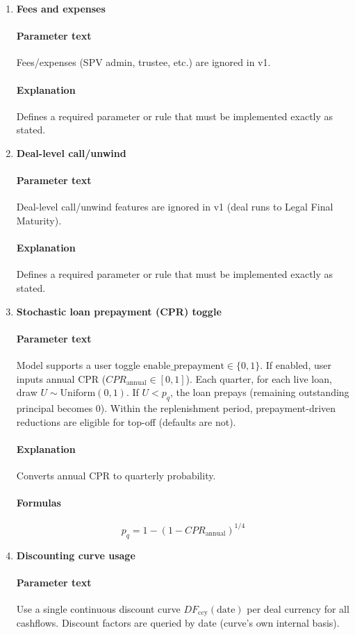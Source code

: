 \documentclass[11pt]{article}
\begin{document}
\begin{enumerate}[label=\arabic*),leftmargin=*,align=left]
\item \textbf{Fees and expenses}
\paragraph{Parameter text} Fees/expenses (SPV admin, trustee, etc.) are ignored in v1.
\paragraph{Explanation} Defines a required parameter or rule that must be implemented exactly as stated.

\item \textbf{Deal-level call/unwind}
\paragraph{Parameter text} Deal-level call/unwind features are ignored in v1 (deal runs to Legal Final Maturity).
\paragraph{Explanation} Defines a required parameter or rule that must be implemented exactly as stated.

\item \textbf{Stochastic loan prepayment (CPR) toggle}
\paragraph{Parameter text} Model supports a user toggle $\text{enable\_prepayment} \in \{0,1\}$. If enabled, user inputs annual CPR ($CPR_{\text{annual}} \in [0,1]$). Each quarter, for each live loan, draw $U \sim \text{Uniform}(0,1)$. If $U < p_q$, the loan prepays (remaining outstanding principal becomes 0). Within the replenishment period, prepayment-driven reductions are eligible for top-off (defaults are not).
\paragraph{Explanation} Converts annual CPR to quarterly probability.
\paragraph{Formulas} 
\[ p_q = 1 - (1 - CPR_{\text{annual}})^{1/4} \]

\item \textbf{Discounting curve usage}
\paragraph{Parameter text} Use a single continuous discount curve $DF_{\text{ccy}}(\text{date})$ per deal currency for all cashflows. Discount factors are queried by date (curve’s own internal basis).

\end{enumerate}
\end{document}
